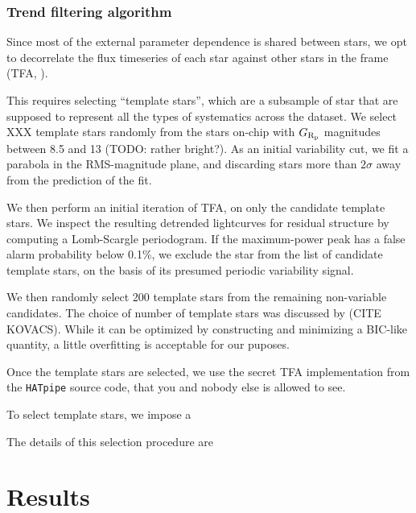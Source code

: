 \documentclass[12pt,twocolumn,tighten]{aastex62}
\begin{document}
\subsubsection{Trend filtering algorithm}
\label{sec:tfa_is_good_enough}


Since most of the external parameter dependence is shared between
stars, we opt to decorrelate the flux timeseries of each star
against other stars in the frame (TFA, \citealt{kovacs_trend_2005}).


This requires selecting ``template stars'', which are a subsample of
star that are supposed to represent all the types of systematics
across the dataset. 
We select XXX template stars randomly from the stars on-chip with
$G_{\rm R_p}$ magnitudes between 8.5 and 13 (TODO: rather bright?).
As an initial variability cut, we fit a parabola in the RMS-magnitude
plane, and discarding stars more than $2\sigma$ away from the
prediction of the fit.

We then perform an initial iteration of TFA, on only the candidate
template stars.
We inspect the resulting detrended lightcurves for residual
structure by computing a Lomb-Scargle periodogram.
If the maximum-power peak has a false alarm probability below 0.1\%, 
we exclude the star from the list of candidate template stars, on the
basis of its presumed periodic variability signal.

We then randomly select 200 template stars from the remaining
non-variable candidates. 
The choice of number of template stars was discussed by (CITE KOVACS).
While it can be optimized by constructing and minimizing a BIC-like 
quantity, a little overfitting is acceptable for our puposes.



Once the template stars are selected, we use the secret TFA
implementation from the \texttt{HATpipe} source code, that you and
nobody else is allowed to see.

To select template stars, we impose a 

The details of this selection procedure are 

\section{Results}
\label{sec:results}
\end{document}
